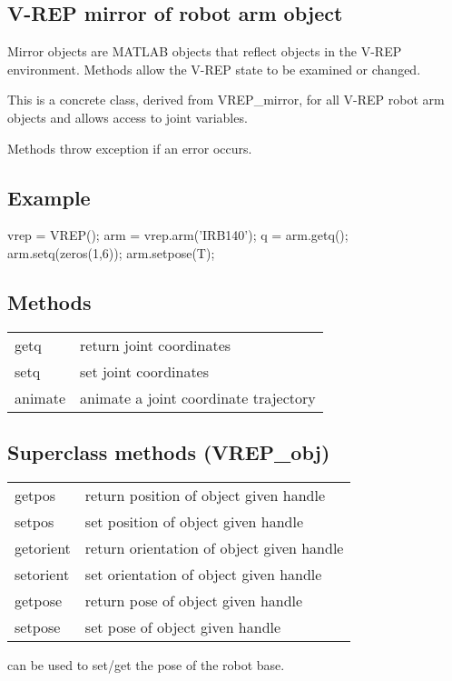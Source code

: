 \documentclass[a4paper]{article}
\begin{document}
\subsection*{V-REP mirror of robot arm object}
Mirror objects are MATLAB objects that reflect objects in the V-REP
environment.  Methods allow the V-REP state to be examined or changed.

This is a concrete class, derived from VREP\_mirror, for all V-REP robot
arm objects and allows access to joint variables.

Methods throw exception if an error occurs.

\subsection*{Example}
\begin{Code}
vrep = VREP();
arm = vrep.arm('IRB140');
q = arm.getq();
arm.setq(zeros(1,6));
arm.setpose(T);  %
\end{Code}
\subsection*{Methods}
\begin{tabular}{lp{120mm}}
 getq & return joint coordinates\\ 
 setq & set joint coordinates\\ 
 animate & animate a joint coordinate trajectory\\ 
\end{tabular}\vspace{1ex}
\subsection*{Superclass methods (VREP\_obj)}
\begin{tabular}{lp{120mm}}
 getpos & return position of object given handle\\ 
 setpos & set position of object given handle\\ 
 getorient & return orientation of object given handle\\ 
 setorient & set orientation of object given handle\\ 
 getpose & return pose of object given handle\\ 
 setpose & set pose of object given handle\\ 
\end{tabular}\vspace{1ex}
can be used to set/get the pose of the robot base.
\end{document}
